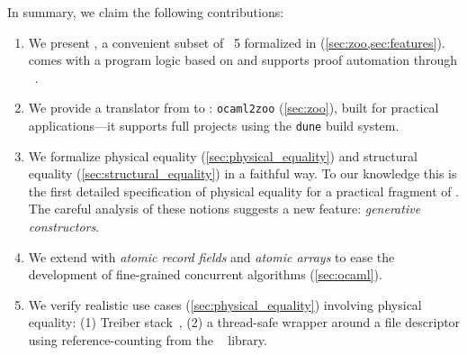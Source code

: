 In summary, we claim the following contributions:
\begin{enumerate}
  \item
    We present \ZooLang, a convenient subset of \OCaml~5 formalized in \Rocq (\cref{sec:zoo,sec:features}).
    \ZooLang comes with a program logic based on \Iris and supports proof automation through \Diaframe~\cite{DBLP:conf/pldi/MulderKG22,DBLP:journals/pacmpl/MulderK23}.
  \item
    We provide a translator from \OCaml to \ZooLang: \texttt{ocaml2zoo} (\cref{sec:zoo}), built for practical
    applications---it supports full projects using the \texttt{dune} build system.
  \item
    We formalize physical equality (\cref{sec:physical_equality}) and structural equality (\cref{sec:structural_equality}) in a faithful way.
    To our knowledge this is the first detailed specification of physical equality for a practical fragment of \OCaml.
    The careful analysis of these notions suggests a new \OCaml feature: \emph{generative constructors}.
  \item
    We extend \OCaml with \emph{atomic record fields} and \emph{atomic arrays} to ease the development of fine-grained concurrent algorithms (\cref{sec:ocaml}).
  \item
    We verify realistic use cases (\cref{sec:physical_equality}) involving physical equality: (1) Treiber stack~\cite{thomas1986systems}, (2) a thread-safe wrapper around a file descriptor using reference-counting from the \Eio~\cite{eio} library.
\end{enumerate}
